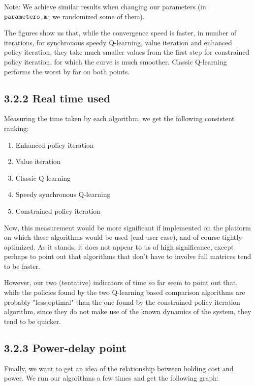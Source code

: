 \documentclass[a4paper, 12pt]{report}
\begin{document}
Note: We achieve similar results when changing our parameters (in $\verb|parameters.m|$; we randomized some of them).

The figures show us that, while the convergence speed is faster, in number of iterations, for synchronous speedy Q-learning,
value iteration and enhanced policy iteration, they take much smaller values from the first step for constrained policy iteration, for
which the curve is much smoother.
Classic Q-learning performs the worst by far on both points.

\subsection*{3.2.2 Real time used}

Measuring the time taken by each algorithm, we get the following consistent ranking:
\begin{enumerate}
\item Enhanced policy iteration
\item Value iteration
\item Classic Q-learning
\item Speedy synchronous Q-learning
\item Constrained policy iteration
\end{enumerate}

Now, this measurement would be more significant if implemented on the platform on which these algorithms would be used (end user case),
and of course tightly optimized.
As it stands, it does not appear to us of high significance, except perhaps to point out that algorithms that don't have to involve full matrices tend to be faster.

However, our two (tentative) indicators of time so far seem to point out that, while the policies found by the two Q-learning based comparison algorithms are probably "less optimal" than the one found by the constrained policy iteration algorithm, since they do not make use of the known dynamics of the system, they tend to be quicker.

\subsection*{3.2.3 Power-delay point}

Finally, we want to get an idea of the relationship between holding cost and power.
We run our algorithms a few times and get the following graph:
\end{document}
